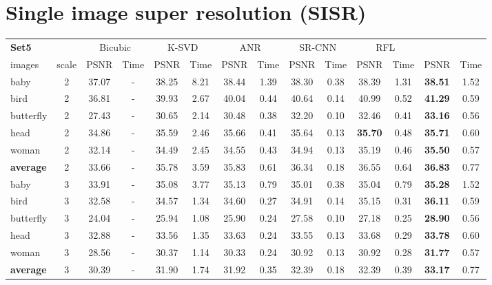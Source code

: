\documentclass[10pt,journal,compsoc]{IEEEtran}
\begin{document}
\section{Single image super resolution (SISR)}
\begin{table*}[t!]
\centering
\begin{tabular}{|l| c| c| c| c| c| c| c| c| c| c| c|c| c|}
\hline
\textbf{Set5} & & \multicolumn{2}{c|}{Bicubic}& \multicolumn{2}{c|}{K-SVD \cite{SRKSVD}}& \multicolumn{2}{c|}{ANR \cite{ANR}}
& \multicolumn{2}{c|}{SR-CNN \cite{SRCNN}} & \multicolumn{2}{c|}{RFL \cite{schulter15}} 
& \multicolumn{2}{c|}{} \\
\cline{3-14}
images & scale & PSNR & Time& PSNR & Time& PSNR & Time& PSNR & Time& PSNR & Time& PSNR & Time\\
\hline\hline
baby & 2 & 37.07 & - &38.25 & 8.21 & 38.44 & 1.39 & 38.30 & 0.38 & 38.39 & 1.31 & \textbf{38.51} & 1.52\\
bird  & 2 & 36.81 & - &39.93 & 2.67 & 40.04 & 0.44 & 40.64 & 0.14 & 40.99 & 0.52 & \textbf{41.29} & 0.59 \\
butterfly  & 2 & 27.43 & - & 30.65 & 2.14 & 30.48 & 0.38 & 32.20 & 0.10 & 32.46 & 0.41 & \textbf{33.16} & 0.56\\
head  & 2 & 34.86 & - & 35.59 & 2.46 &35.66 & 0.41 & 35.64 & 0.13 & \textbf{35.70} & 0.48 & \textbf{35.71} & 0.60\\
woman  & 2 & 32.14 & - & 34.49 & 2.45 & 34.55 & 0.43 & 34.94 & 0.13 & 35.19 & 0.46 & \textbf{35.50} & 0.57\\
\hline\hline
\rowcolor[gray]{0.85} \textbf{average}  & 2 
& 33.66 & - & 35.78 & 3.59 & 35.83 & 0.61 & 36.34 & 0.18 & 36.55 & 0.64 & \textbf{36.83} & 0.77\\
\hline\hline
baby & 3 & 33.91 & - &35.08 & 3.77 & 35.13 & 0.79 & 35.01 & 0.38 & 35.04 & 0.79 & \textbf{35.28} & 1.52\\
bird  & 3 & 32.58 & - &34.57 & 1.34 & 34.60 & 0.27 & 34.91 & 0.14 & 35.15 & 0.31 & \textbf{36.11} & 0.59 \\
butterfly  & 3 & 24.04 & - & 25.94 & 1.08 & 25.90 & 0.24 & 27.58 & 0.10 & 27.18 & 0.25 & \textbf{28.90} & 0.56\\
head  & 3 & 32.88 & - & 33.56 & 1.35 &33.63 & 0.24 & 33.55 & 0.13 & 33.68 & 0.29 & \textbf{33.78} & 0.60\\
woman  & 3 & 28.56 & - & 30.37 & 1.14 & 30.33 & 0.24 & 30.92 & 0.13 & 30.92 & 0.28 & \textbf{31.77} & 0.57\\
\hline\hline
\rowcolor[gray]{0.85} \textbf{average}  & 3
& 30.39 & - & 31.90 & 1.74 & 31.92 & 0.35 & 32.39 & 0.18 & 32.39 & 0.39 & \textbf{33.17} & 0.77\\

\end{tabular}
\end{table*}
\end{document}
